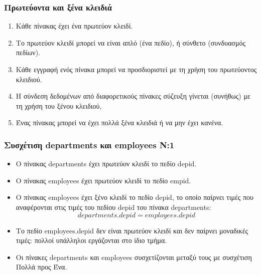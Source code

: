 \begin{frame}
\frametitle{Πρωτεύοντα και ξένα κλειδιά}
\begin{minipage}{\wE}
\begin{enumerate} \itemsep 6pt %
  \item Κάθε πίνακας έχει ένα {\crr πρωτεύον κλειδί}.
  \item Το {\crr πρωτεύον κλειδί} μπορεί να είναι απλό (ένα πεδίο), ή σύνθετο
        (συνδυασμός πεδίων).
  \item Κάθε εγγραφή ενός πίνακα μπορεί να προσδιοριστεί με τη χρήση του
        πρωτεύοντος κλειδιού.
  \item Η σύνδεση δεδομένων από διαφορετικούς πίνακες {\bbl σύζευξη}
        γίνεται (συνήθως) με τη χρήση του {\crr ξένου κλειδιού},
  \item Ένας πίνακας μπορεί να έχει πολλά ξένα κλειδιά ή  να μην έχει κανένα.
\end{enumerate}
\end{minipage}
\end{frame}


\begin{frame}
\frametitle{Συσχέτιση {\en departments} και {\en employees} Ν:1}
\begin{itemize} \itemsep 6pt
  \item Ο πίνακας {\ra departments} έχει {\crr πρωτεύον κλειδί} το πεδίο {\ra depid}.
  \item Ο πίνακας {\ra employees} έχει {\crr πρωτεύον κλειδί} το πεδίο {\ra empid}.
  \item Ο πίνακας {\ra employees} έχει {\crr ξένο κλειδί} το πεδίο {\ra depid},
        το οποίο παίρνει τιμές που {\bbl αναφέρονται} στις τιμές του πεδίου
        {\ra depid} του πίνακα {\ra departments}:
        \[ departments.depid = employees.depid \]
\end{itemize}
\pause
\begin{minipage}{\wE}
\begin{itemize} 
  \item Το πεδίο {\ra employees.depid}  {\crr δεν είναι πρωτεύον κλειδί}
        και δεν παίρνει μοναδικές τιμές: πολλοί υπάλληλοι εργάζονται
        στο ίδιο τμήμα.
  \item Οι πίνακες {\ra departments} και {\ra employees}  συσχετίζονται μεταξύ τους
        με συσχέτιση {\cee Πολλά προς Ένα}.
\end{itemize}
\end{minipage}
\end{frame}



